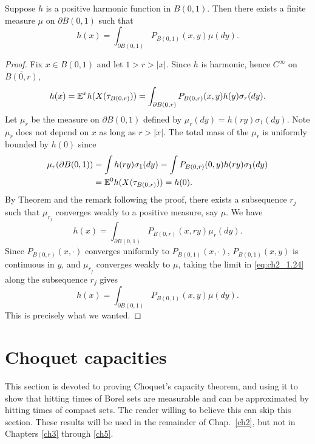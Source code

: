 \begin{proposition}\label{prop:ch2_1.22}
Suppose $h$ is a positive harmonic function in $B(0,1)$. Then there exists a finite measure $\mu$ on $\partial B(0,1)$ such that
\[
    h(x) = \int_{\partial B(0,1)} P_{B(0,1)}(x,y)\mu(dy).
\]
\end{proposition}

\begin{proof}
Fix $x \in B(0,1)$ and let $1 > r > |x|$. Since $h$ is harmonic, hence $C^\infty$ on $\overline{B(0,r)}$,
\[
    h(x) = \mathbb{E}^x h(X(\tau_{B(0,r)})) = \int_{\partial B(0,r)} P_{B(0,r)}(x,y)h(y)\sigma_r(dy).
\]
Let $\mu_r$ be the measure on $\partial B(0,1)$ defined by $\mu_r(dy) = h(ry)\sigma_1(dy)$. Note $\mu_r$ does not depend on $x$ as long as $r > |x|$. The total mass of the $\mu_r$ is uniformly bounded by $h(0)$ since
\begin{align*}
    \mu_r(\partial B(0,1)) &= \int h(ry)\sigma_1(dy) = \int P_{B(0,r)}(0,y)h(ry)\sigma_1(dy) \\
    &= \mathbb{E}^0h(X(\tau_{B(0,r)})) = h(0).
\end{align*}
By Theorem  and the remark following the proof, there exists a subsequence $r_j$ such that $\mu_{r_j}$ converges weakly to a positive measure, say $\mu$. We have
\begin{equation}\label{eq:ch2_1.24}
    h(x) = \int_{\partial B(0,1)} P_{B(0,r)}(x,ry)\mu_r(dy).
\end{equation}
Since $P_{B(0,r)}(x,\cdot)$ converges uniformly to $P_{B(0,1)}(x,\cdot)$, $P_{B(0,1)}(x,y)$ is continuous in $y$, and $\mu_{r_j}$ converges weakly to $\mu$, taking the limit in \eqref{eq:ch2_1.24} along the subsequence $r_j$ gives
\[
    h(x) = \int_{\partial B(0,1)} P_{B(0,1)}(x,y)\mu(dy).
\]
This is precisely what we wanted.
\end{proof}


\section{Choquet capacities}\label{ch2_sec2}


This section is devoted to proving Choquet's capacity theorem, and using it to show that hitting times of Borel sets are measurable and can be approximated by hitting times of compact sets. The reader willing to believe this can skip this section. These results will be used in the remainder of Chap.\ \ref{ch2}, but not in Chapters \ref{ch3} through \ref{ch5}.

